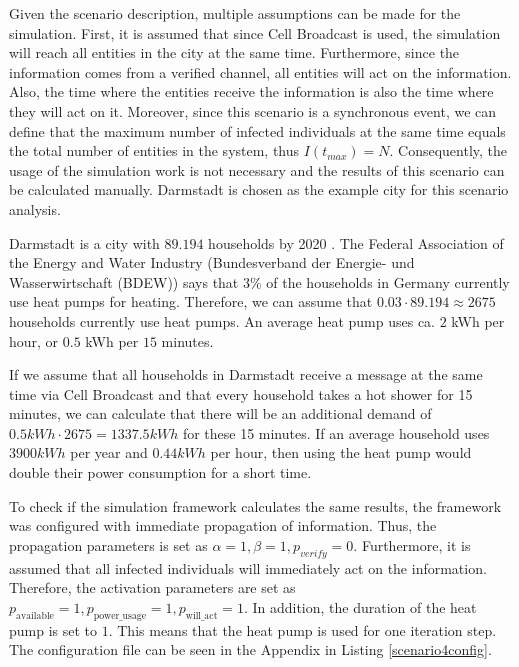 Given the scenario description, multiple assumptions can be
made for the simulation.
First, it is assumed that since Cell Broadcast is used, the simulation
will reach all entities in the city at the same time.
Furthermore, since the information comes from a verified channel,
all entities will act on the information. Also, the time where the
entities receive the information is also the time where they will act
on it.
Moreover, since this scenario is a synchronous event, we can define that the
maximum number of infected individuals at the same time equals
the total number of entities in the system, thus $I(t_{max})=N$.
Consequently, the usage of the simulation work is not necessary
and the results of this scenario can be calculated manually.
Darmstadt is chosen as the example city for this scenario analysis.

Darmstadt is a city with $89.194$ households by 2020 
\cite{statistadarmstadt}. The 
Federal Association of the Energy and Water Industry
(Bundesverband der Energie- und Wasserwirtschaft (BDEW)) 
says that $3\%$ of the households in Germany currently use
heat pumps for heating. Therefore, we can assume that 
$0.03 \cdot 89.194 \approx 2675$ households currently use 
heat pumps. An average heat pump uses ca. $2$ kWh per hour, 
or $0.5$ kWh per $15$ minutes.

If we assume that all households in Darmstadt receive 
a message at the same time via Cell Broadcast and that
every household takes a hot shower for 15 minutes,
we can calculate that there will be an additional 
demand of $0.5kWh \cdot 2675 = 1337.5 kWh $ for these 
15 minutes. If an average household uses $3900 kWh$ 
per year and $0.44kWh$ per hour, then using the heat pump 
would double their power consumption for a short time.

To check if the simulation framework calculates the same 
results, the framework was configured with immediate
propagation of information. Thus, the propagation
parameters is set as 
$\alpha=1, \beta=1, p_{verify}=0$. 
Furthermore, it is assumed that all infected 
individuals will immediately act on the information.
Therefore, the activation parameters are 
set as $p_{\mathrm{available}}=1, 
p_{\mathrm{power\_usage}}=1, p_{\mathrm{will\_act}}=1$.
In addition, the duration of the heat pump is set to $1$.
This means that the heat pump is used for one iteration step.
The configuration file can be seen in the Appendix in
Listing \ref{scenario4config}.


